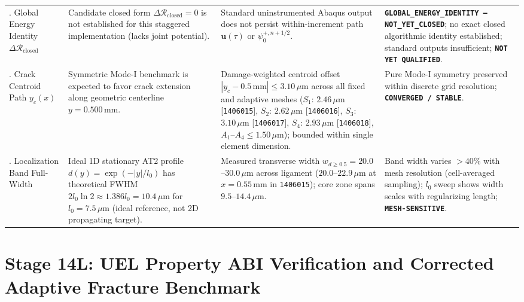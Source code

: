 \begin{table}[htbp]
\begin{tabularx}{\textwidth}{p{2.2cm}p{3.8cm}p{4.2cm}X}
\addlinespace
11. Global Energy Identity $\Delta \mathcal{R}_{\mathrm{closed}}$ & Candidate closed form $\Delta \mathcal{R}_{\mathrm{closed}} = 0$ is not established for this staggered implementation (lacks joint potential). & Standard uninstrumented Abaqus output does not persist within-increment path $\mathbf{u}(\tau)$ or $\psi_0^{+, n+1/2}$. & \textbf{\texttt{GLOBAL\_ENERGY\_IDENTITY --- NOT\_YET\_CLOSED}}; no exact closed algorithmic identity established; standard outputs insufficient; \textbf{\texttt{NOT YET QUALIFIED}}. \\
\addlinespace
12. Crack Centroid Path $y_c(x)$ & Symmetric Mode-I benchmark is expected to favor crack extension along geometric centerline $y = 0.500\,\mathrm{mm}$. & Damage-weighted centroid offset $|y_c - 0.5\,\mathrm{mm}| \le 3.10\,\mu\mathrm{m}$ across all fixed and adaptive meshes ($S_1$: $2.46\,\mu\mathrm{m}$ [\texttt{1406015}], $S_2$: $2.62\,\mu\mathrm{m}$ [\texttt{1406016}], $S_3$: $3.10\,\mu\mathrm{m}$ [\texttt{1406017}], $S_4$: $2.93\,\mu\mathrm{m}$ [\texttt{1406018}], $A_1$--$A_4 \le 1.50\,\mu\mathrm{m}$); bounded within single element dimension. & Pure Mode-I symmetry preserved within discrete grid resolution; \textbf{\texttt{CONVERGED / STABLE}}. \\
\addlinespace
13. Localization Band Full-Width & Ideal 1D stationary AT2 profile $d(y) = \exp(-|y|/l_0)$ has theoretical FWHM $2 l_0 \ln 2 \approx 1.386 l_0 = 10.4\,\mu\mathrm{m}$ for $l_0 = 7.5\,\mu\mathrm{m}$ (ideal reference, not 2D propagating target). & Measured transverse width $w_{d \ge 0.5} = 20.0$--$30.0\,\mu\mathrm{m}$ across ligament ($20.0$--$22.9\,\mu\mathrm{m}$ at $x=0.55\,\mathrm{mm}$ in \texttt{1406015}); core zone spans $9.5$--$14.4\,\mu\mathrm{m}$. & Band width varies $>40\%$ with mesh resolution (cell-averaged sampling); $l_0$ sweep shows width scales with regularizing length; \textbf{\texttt{MESH-SENSITIVE}}. \\
\bottomrule
\end{tabularx}
\end{table}

\section{Stage 14L: UEL Property ABI Verification and Corrected Adaptive Fracture Benchmark}
\label{sec:stage14l_reproducibility}

